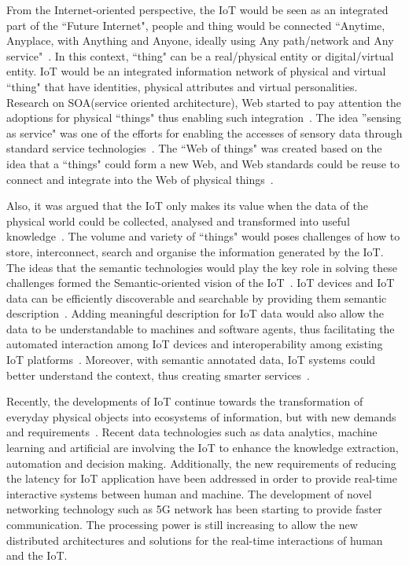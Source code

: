 From the Internet-oriented perspective, the IoT would be seen as an integrated part of the ``Future Internet", people and thing would be connected ``Anytime, Anyplace, with Anything and Anyone, ideally using Any path/network and Any service"~\citep{Sundmaeker:2010}.
In this context, ``thing" can be a real/physical entity or digital/virtual entity.
IoT would be an integrated information network of physical and virtual ``thing" that have identities, physical attributes and virtual personalities.  
Research on SOA(service oriented architecture), Web started to pay attention the adoptions for physical ``things" thus enabling such integration~\citep{De:2011, De:2012,Guinard:2009}. 
The idea ''sensing as service" was one of the efforts for enabling the accesses of sensory data through standard service technologies~\citep{Zaslavsky:2013,Perera:2014a}. 
The ``Web of things" was created based on the idea that a ``things" could form a new Web, and Web standards could be reuse to connect and integrate into the Web of physical things~\citep{Christophe:2011}.

Also, it was argued that the IoT only makes its value when the data of the physical world could be collected, analysed and transformed into useful knowledge~\citep{Vermesan:2011}.
The volume and variety of ``things" would poses challenges of how to store, interconnect, search and organise the information generated by the IoT. 
The ideas that the semantic technologies would play the key role in solving these challenges formed the Semantic-oriented vision of the IoT~\citep{Atzori:2014,Barnaghi:2012}.
IoT devices and IoT data can be efficiently discoverable and searchable by providing them semantic description~\citep{Ioan:2009, Chun:2015,Serena:2017}. 
Adding meaningful description for IoT data would also allow the data to be understandable to machines and software agents, thus facilitating the automated interaction among IoT devices and interoperability among existing IoT platforms~\citep{IERC:2015, Ganzha:2017}. 
Moreover, with semantic annotated data, IoT systems could better understand the context, thus creating smarter services~\citep{Perera:2014b}. 

Recently, the developments of IoT continue towards the transformation of everyday physical objects into ecosystems of information, but with new demands and requirements~\citep{Vermesan:2018}.
Recent data technologies such as data analytics, machine learning and artificial are involving the IoT to enhance the knowledge extraction, automation and decision making. 
Additionally, the new requirements of reducing the latency for IoT application have been addressed in order to provide real-time interactive systems between human and machine.
The development of novel networking technology such as 5G network has been starting to provide faster communication.
The processing power is still increasing to allow the new distributed architectures and solutions for the real-time interactions of human and the IoT.  

